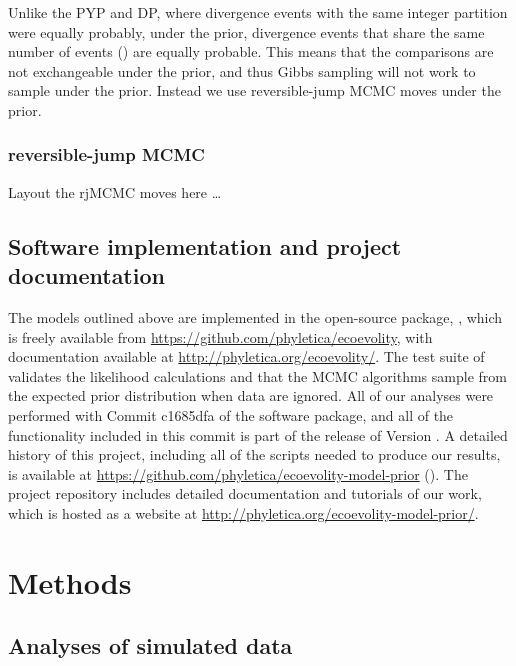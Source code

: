 \documentclass[letterpaper,12pt]{article}
\begin{document}
Unlike the PYP and DP, where divergence events with the same
integer partition were equally probably, under the
\wunif prior, divergence events that share the same number of events (\nevents) are
equally probable.
This means that the comparisons are not exchangeable under the \wunif prior,
and thus Gibbs sampling will not work to sample \etimesets under the \wunif
prior.
Instead we use reversible-jump MCMC moves under the \wunif prior.

\subsubsection{reversible-jump MCMC}
Layout the rjMCMC moves here \ldots


\subsection{Software implementation and project documentation}

The models outlined above are implemented in the open-source \cpp package,
\ecoevolity, which is freely available from
\url{https://github.com/phyletica/ecoevolity}, with documentation available
at
\url{http://phyletica.org/ecoevolity/}.
The test suite of \ecoevolity
validates the likelihood calculations and that the MCMC algorithms sample from
the expected prior distribution when data are ignored.
All of our analyses were performed with
Commit c1685dfa
of the \ecoevolity software package,
and all of the functionality included in this commit is part of
the release of Version .
A detailed history of this project, including all of the scripts
needed to produce our results, is available at
\url{https://github.com/phyletica/ecoevolity-model-prior}
().
The project repository includes detailed documentation and tutorials of our
work, which is hosted as a website at
\url{http://phyletica.org/ecoevolity-model-prior/}.

\section{Methods}

\subsection{Analyses of simulated data}
\end{document}
